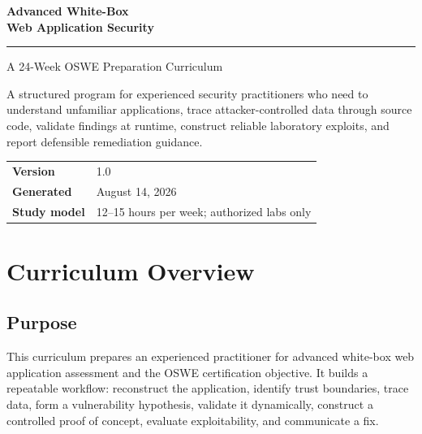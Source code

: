 \documentclass[11pt]{article}
\begin{document}
\hypersetup{pageanchor=false}

\begin{titlepage}
  \thispagestyle{empty}
  \pagecolor{Navy}
  \color{white}
  \vspace*{0.11\textheight}
  {\sffamily\bfseries\fontsize{31}{36}\selectfont
    Advanced White-Box\\[3pt]
    Web Application Security\par}
  \vspace{0.55cm}
  {\color{Gold}\rule{0.48\textwidth}{2.2pt}}\par
  \vspace{0.6cm}
  {\sffamily\fontsize{19}{24}\selectfont
    A 24-Week OSWE Preparation Curriculum\par}
  \vspace{1.2cm}
  \begin{tcolorbox}[
    width=0.86\textwidth,
    colback=white!7!Navy,
    colframe=white!35!Navy,
    coltext=white,
    boxrule=0.8pt]
    A structured program for experienced security practitioners who need to
    understand unfamiliar applications, trace attacker-controlled data through
    source code, validate findings at runtime, construct reliable laboratory
    exploits, and report defensible remediation guidance.
  \end{tcolorbox}
  \vfill
  \begin{tabularx}{0.86\textwidth}{@{}L{0.26\textwidth}Y@{}}
    \color{Gold}\sffamily\bfseries Version & 1.0 \\
    \color{Gold}\sffamily\bfseries Generated & August 14, 2026 \\
    \color{Gold}\sffamily\bfseries Study model & 12--15 hours per week; authorized labs only \\
  \end{tabularx}
  \vspace*{0.06\textheight}
\end{titlepage}
\nopagecolor
\color{black}

\hypersetup{pageanchor=true}
\tableofcontents
\clearpage
{}

\section{Curriculum Overview}

\subsection{Purpose}
This curriculum prepares an experienced practitioner for advanced white-box web
application assessment and the OSWE certification objective. It builds a
repeatable workflow: reconstruct the application, identify trust boundaries,
trace data, form a vulnerability hypothesis, validate it dynamically, construct
a controlled proof of concept, evaluate exploitability, and communicate a fix.
\end{document}

